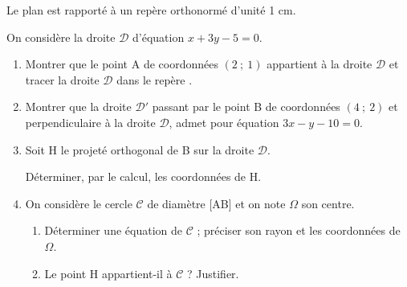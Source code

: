 \bigskip

Le plan est rapporté à un repère orthonormé \Oij{} d'unité 1 cm.

On considère la droite $\mathcal D$ d'équation $x+3y-5=0$.

\medskip

\begin{enumerate}
\item Montrer que le point A de coordonnées $(2~;~1)$ appartient à la droite $\mathcal D$ et tracer la droite $\mathcal D$ dans le repère \Oij.
\item Montrer que la droite $\mathcal D'$ passant par le point B de coordonnées $(4~;~2)$ et perpendiculaire à la droite $\mathcal D$, admet pour équation $3x-y-10=0$.
\item Soit H le projeté orthogonal de B sur la droite $\mathcal D$.

Déterminer, par le calcul, les coordonnées de H.
\item On considère le cercle $\mathcal C$ de diamètre [AB] et on note $\Omega$ son centre.
	\begin{enumerate}
		\item Déterminer une équation de $\mathcal C$ ; préciser son rayon et les coordonnées de $\Omega$.
		\item Le point H appartient-il à $\mathcal C$ ? Justifier.
	\end{enumerate}
\end{enumerate}
